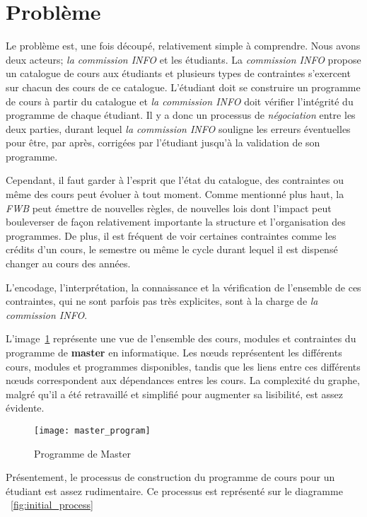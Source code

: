 \clearpage
\section{Problème}
Le problème est, une fois découpé, relativement simple à comprendre. Nous avons deux acteurs; \textit{la commission INFO} et les étudiants. 
La \textit{commission INFO} propose un catalogue de cours aux étudiants et plusieurs types de contraintes s'exercent sur chacun des cours de ce catalogue. L'étudiant doit se construire un programme de cours à partir du catalogue et \textit{la commission INFO} doit vérifier l'intégrité du programme de chaque étudiant. Il y a donc un processus de \textit{négociation} entre les deux parties, durant lequel \textit{la commission INFO} souligne les erreurs éventuelles pour être, par après,  corrigées par l'étudiant jusqu'à la validation de son programme.

Cependant, il faut garder à l'esprit que l'état du catalogue, des contraintes ou même des cours peut évoluer à tout moment. Comme mentionné plus haut, la \textit{FWB} peut émettre de nouvelles règles, de nouvelles lois dont l'impact peut bouleverser de façon relativement importante la structure et l'organisation des programmes. De plus, il est fréquent de voir certaines contraintes comme les crédits d'un cours, le semestre ou même le cycle durant lequel il est dispensé changer au cours des années.

L'encodage, l'interprétation, la connaissance et la vérification de l'ensemble de ces contraintes, qui ne sont parfois pas très explicites, sont à la charge de \textit{la commission INFO}.

L'image~\ref{fig:master_program} représente une vue de l'ensemble des cours, modules et contraintes du programme de \textbf{master} en informatique. Les nœuds représentent les différents cours, modules et programmes disponibles, tandis que les liens entre ces différents nœuds correspondent aux dépendances entres les cours. La complexité du graphe, malgré qu'il a été retravaillé et simplifié pour augmenter sa lisibilité, est assez évidente.

\begin{figure}
\centering
\caption{Programme de Master}
\texttt{[image: master\_program]}
\label{fig:master_program}
\end{figure}

Présentement, le processus de construction du programme de cours pour un étudiant est assez rudimentaire. Ce processus est représenté sur le diagramme ~\ref{fig:initial_process}

